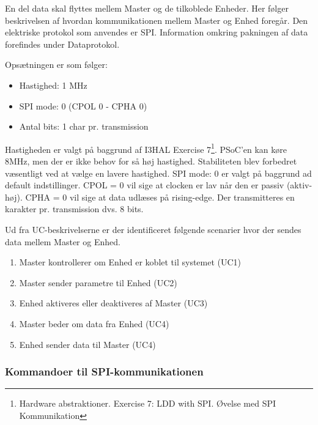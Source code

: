 
En del data skal flyttes mellem Master og de tilkoblede Enheder. Her følger beskrivelsen af hvordan kommunikationen mellem Master og Enhed foregår. Den elektriske protokol som anvendes er SPI.
Information omkring pakningen af data forefindes under Dataprotokol.

Opsætningen er som følger:

\begin{itemize}
  \item Hastighed: 1 MHz
  \item SPI mode: 0 (CPOL 0 - CPHA 0)
  \item Antal bits: 1 char pr. transmission
\end{itemize}

Hastigheden er valgt på baggrund af I3HAL Exercise 7\footnote{Hardware abstraktioner. Exercise 7: LDD with SPI. Øvelse med SPI Kommunikation}. PSoC'en kan køre 8MHz, men der er ikke behov for så høj hastighed. Stabiliteten blev forbedret væsentligt ved at vælge en lavere hastighed. 
\newline SPI mode: 0 er valgt på baggrund ad default indstillinger. 
\newline CPOL = 0 vil sige at clocken er lav når den er passiv (aktiv-høj). 
\newline CPHA = 0 vil sige at data udlæses på rising-edge. 
\newline Der transmitteres en karakter pr. transmission dvs. 8 bits.

Ud fra UC-beskrivelserne er der identificeret følgende scenarier hvor der sendes data mellem Master og Enhed.

\begin{enumerate}
	\item Master kontrollerer om Enhed er koblet til systemet (UC1)
	\item Master sender parametre til Enhed (UC2)
	\item Enhed aktiveres eller deaktiveres af Master (UC3)
	\item Master beder om data fra Enhed (UC4)
	\item Enhed sender data til Master (UC4)
\end{enumerate}


\subsubsection*{Kommandoer til SPI-kommunikationen}

